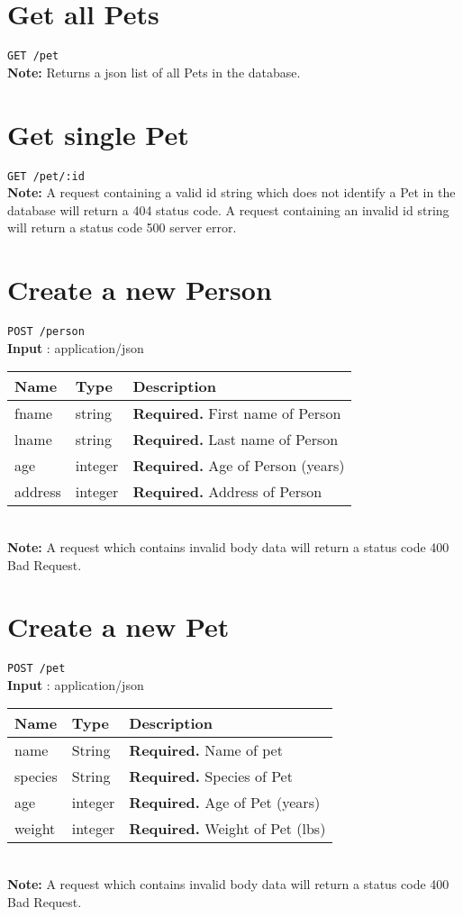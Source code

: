 \documentclass{article}
\begin{document}
\section*{Get all Pets}
\texttt{GET /pet} \\
\textbf{Note:} Returns a json list of all Pets in the database.

\section*{Get single Pet}
\texttt{GET /pet/:id} \\
\textbf{Note:} A request containing a valid id string which does not
identify a Pet in the database will return a 404 status code. A request
containing an invalid id string will return a status code 500 server error.

\section*{Create a new Person}
\texttt{POST /person} \\
\textbf{Input} : application/json \\
\begin{tabular}{| l | l | l |}
	\hline
	\textbf{Name} & \textbf{Type} & \textbf{Description} \\
	\hline
	fname         & string        & \textbf{Required.} First name of Person \\
	\hline
	lname         & string        & \textbf{Required.} Last name of Person \\
	\hline
	age           & integer       & \textbf{Required.} Age of Person (years) \\
	\hline
	address       & integer       & \textbf{Required.} Address of Person \\
	\hline
\end{tabular} \\
\textbf{Note:} A request which contains invalid body data will return a
status code 400 Bad Request.

\section*{Create a new Pet}
\texttt{POST /pet} \\
\textbf{Input} : application/json \\
\begin{tabular}{| l | l | l |}
	\hline
	\textbf{Name} & \textbf{Type} & \textbf{Description} \\
	\hline
	name          & String        & \textbf{Required.} Name of pet \\
	\hline
	species       & String        & \textbf{Required.} Species of Pet \\
	\hline
	age           & integer       & \textbf{Required.} Age of Pet (years) \\
	\hline
	weight        & integer       & \textbf{Required.} Weight of Pet (lbs) \\
	\hline
\end{tabular} \\
\textbf{Note:} A request which contains invalid body data will return a
status code 400 Bad Request.
\end{document}
